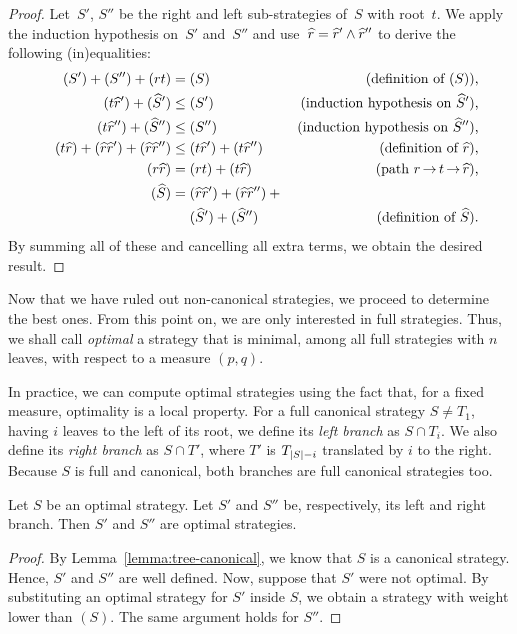\begin{proof}
Let~$S'$, $S''$ be the right and left sub-strategies of~$S$ with
root~$t$. We apply the induction hypothesis on~$S'$ and~$S''$ and
use~$\widehat{r} = \widehat{r}' \wedge \widehat{r}''$ to derive the following (in)equalities:
\begin{align*}
(S') + (S'') + (rt) &= (S)
  & \text{(definition of~$(S)$),}\\
(t\widehat{r}') + (\widehat{S}') &\leq (S')
  & \text{(induction hypothesis on~$\widehat{S}'$),}\\
(t\widehat{r}'') + (\widehat{S}'') &\leq (S'')
  & \text{(induction hypothesis on~$\widehat{S}''$),} \\
\quad (t\widehat{r})+ (\widehat{r}\widehat{r}') + (\widehat{r}\widehat{r}'') & \leq  (t\widehat{r}') + (t\widehat{r}'')
  & \text{(definition of~$\widehat{r}$),}\\
(r\widehat{r}) &= (rt) + (t\widehat{r})
  & \text{(path $r \mathop{\rightarrow} t \mathop{\rightarrow} \widehat{r}$),}\\
(\widehat{S}) &= (\widehat{r}\widehat{r}') + (\widehat{r}\widehat{r}'') + {} & \\
& \quad\ (\widehat{S}') + (\widehat{S}'')
  & \text{(definition of~$\widehat{S}$).}
\end{align*}
By summing all of these and cancelling all extra terms, we obtain the
desired result.
\end{proof}

Now that we have ruled out non-canonical strategies, we proceed to
determine the best ones. From this point on, we are only interested in
full strategies. Thus, we shall call \emph{optimal} a strategy that is
minimal, among all full strategies with $n$ leaves, with respect to a
measure $(p,q)$.

In practice, we can compute optimal strategies using the fact that,
for a fixed measure, optimality is a local property. For a full
canonical strategy $S\ne T_1$, having $i$ leaves to the left of its
root, we define its \emph{left branch} as $S \cap T_i$. We also define
its \emph{right branch} as $S \cap T'$, where $T'$ is $T_{\left|S\right|-i}$
translated by $i$ to the right. Because $S$ is full and canonical,
both branches are full canonical strategies too.

\begin{lemma}\label{lem:cost}
  Let $S$ be an optimal strategy. Let $S'$ and $S''$ be, respectively,
  its left and right branch. Then $S'$ and $S''$ are optimal
  strategies.
\end{lemma}
\begin{proof}
  By Lemma~\ref{lemma:tree-canonical}, we know that $S$ is a canonical
  strategy. Hence, $S'$ and $S''$ are well defined.  Now, suppose that
  $S'$ were not optimal. By substituting an optimal strategy for $S'$
  inside $S$, we obtain a strategy with weight lower than $(S)$. The
  same argument holds for $S''$.
\end{proof}

